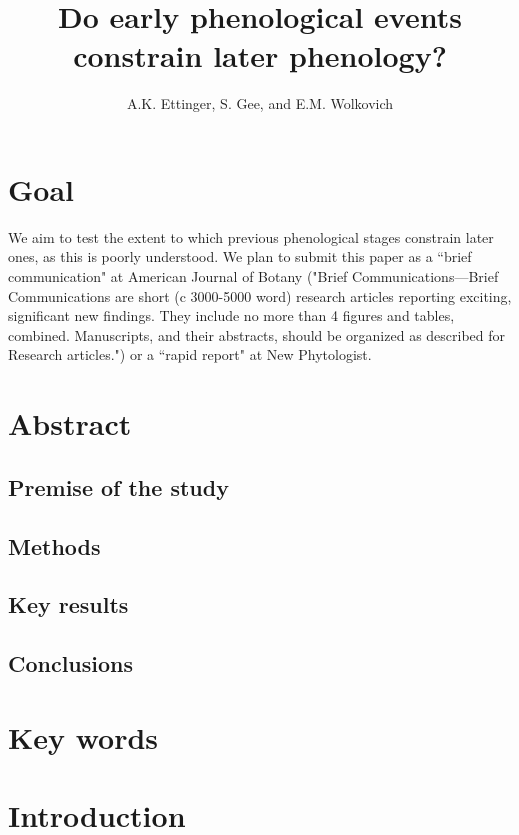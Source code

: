\documentclass{article}
\begin{document}
 
\title{Do early phenological events constrain later phenology?} 
\author{A.K. Ettinger, S. Gee, and E.M. Wolkovich}
\maketitle  %

\section* {Goal}
\par We aim to test the extent to which previous phenological stages constrain later ones, as this is poorly understood. We plan to submit this paper as a ``brief communication" at	American Journal of Botany ("Brief Communications—Brief Communications are short (c 3000-5000 word) research articles reporting exciting, significant new findings. They include no more than 4 figures and tables, combined. Manuscripts, and their abstracts, should be organized as described for Research articles.") or a ``rapid report" at
New Phytologist.

\section*{Abstract}
\subsection*{Premise of the study}
\subsection*{Methods}
\subsection*{Key results}
\subsection*{Conclusions}
\section* {Key words}
\section* {Introduction}
\end{document}
